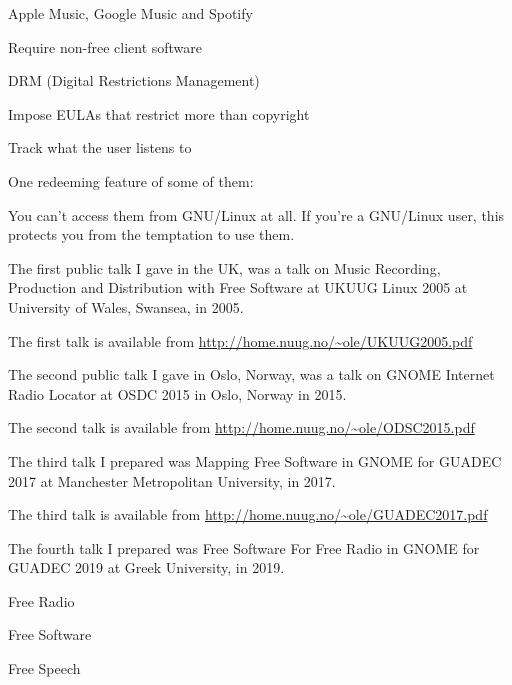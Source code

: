 \documentclass[20pt,landscape]{foils}
\begin{document}

\begin{list1}
\item Apple Music, Google Music and Spotify
  \begin{list2}
  \item Require non-free client software
  \item DRM (Digital Restrictions Management)
  \item Impose EULAs that restrict more than copyright
  \item Track what the user listens to
  \end{list2}
\end{list1}

One redeeming feature of some of them:

\begin{list2}
\item You can't access them from GNU/Linux at all.  If you're a GNU/Linux user, this protects you from the temptation to use them.
\end{list2}


The first public talk I gave in the UK, was a talk on Music Recording, Production and Distribution with Free Software at
UKUUG Linux 2005 at University of Wales, Swansea, in 2005.

The first talk is available from \url{http://home.nuug.no/~ole/UKUUG2005.pdf}

The second public talk I gave in Oslo, Norway, was a talk on GNOME Internet Radio Locator at OSDC 2015 in Oslo, Norway in 2015.

The second talk is available from \url{http://home.nuug.no/~ole/ODSC2015.pdf}

The third talk I prepared was Mapping Free Software in GNOME for GUADEC 2017 at Manchester Metropolitan University, in 2017.

The third talk is available from \url{http://home.nuug.no/~ole/GUADEC2017.pdf}

The fourth talk I prepared was Free Software For Free Radio in GNOME for GUADEC 2019 at Greek University, in 2019.

\begin{list1}
\item Free Radio
\item Free Software
\item Free Speech
\end{list1}
\end{document}
